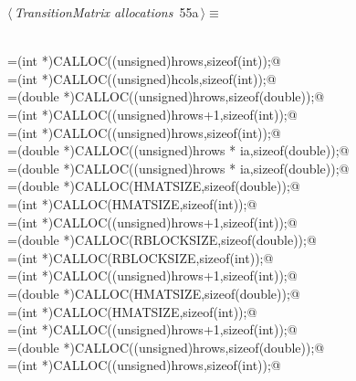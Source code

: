 \documentclass{article}
\begin{document}
\begin{flushleft} \small
\begin{minipage}{\linewidth}\label{scrap81}\raggedright\small
{} $\langle\,${\itshape TransitionMatrix allocations}\nobreak\ {\footnotesize {55a}}$\,\rangle\equiv$
\vspace{-1ex}
\begin{list}{}{} \item
\mbox{}\verb@@\\
\mbox{}\verb@perm=(int *)CALLOC((unsigned)hrows,sizeof(int));@\\
\mbox{}\verb@iw =(int *)CALLOC((unsigned)hcols,sizeof(int));@\\
\mbox{}\verb@xo=(double *)CALLOC((unsigned)hrows,sizeof(double));@\\
\mbox{}\verb@ixo=(int *)CALLOC((unsigned)hrows+1,sizeof(int));@\\
\mbox{}\verb@jxo=(int *)CALLOC((unsigned)hrows,sizeof(int));@\\
\mbox{}\verb@x=(double *)CALLOC((unsigned)hrows * ia,sizeof(double));@\\
\mbox{}\verb@y=(double *)CALLOC((unsigned)hrows * ia,sizeof(double));@\\
\mbox{}\verb@tempHmat=(double *)CALLOC(HMATSIZE,sizeof(double));@\\
\mbox{}\verb@tempHmatj=(int *)CALLOC(HMATSIZE,sizeof(int));@\\
\mbox{}\verb@tempHmati=(int *)CALLOC((unsigned)hrows+1,sizeof(int));@\\
\mbox{}\verb@tempRmat=(double *)CALLOC(RBLOCKSIZE,sizeof(double));@\\
\mbox{}\verb@tempRmatj=(int *)CALLOC(RBLOCKSIZE,sizeof(int));@\\
\mbox{}\verb@tempRmati=(int *)CALLOC((unsigned)hrows+1,sizeof(int));@\\
\mbox{}\verb@gmat=(double *)CALLOC(HMATSIZE,sizeof(double));@\\
\mbox{}\verb@gmatj=(int *)CALLOC(HMATSIZE,sizeof(int));@\\
\mbox{}\verb@gmati=(int *)CALLOC((unsigned)hrows+1,sizeof(int));@\\
\mbox{}\verb@diag=(double *)CALLOC((unsigned)hrows,sizeof(double));@\\
\mbox{}\verb@idiag=(int *)CALLOC((unsigned)hrows,sizeof(int));@\\
\mbox{}\verb@@{\NWsep}
\end{list}
\vspace{-1.5ex}
\footnotesize
\begin{list}{}{\setlength{\itemsep}{-\parsep}\setlength{\itemindent}{-\leftmargin}}

\end{list}
\end{minipage}
\end{flushleft}
\end{document}
